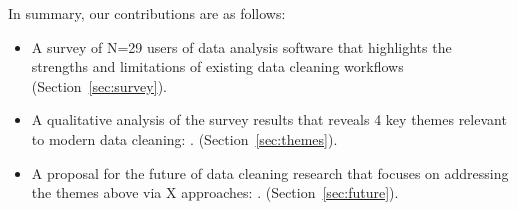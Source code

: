 In summary, our contributions are as follows:
\begin{itemize}
\item A survey of N=29 users of data analysis software that highlights the strengths and limitations of existing data cleaning workflows (Section~\ref{sec:survey}).
\item A qualitative analysis of the survey results that reveals 4 key themes relevant to modern data cleaning: . (Section~\ref{sec:themes}).
\item A proposal for the future of data cleaning research that focuses on addressing the themes above via X approaches: .  (Section~\ref{sec:future}).
\end{itemize}
